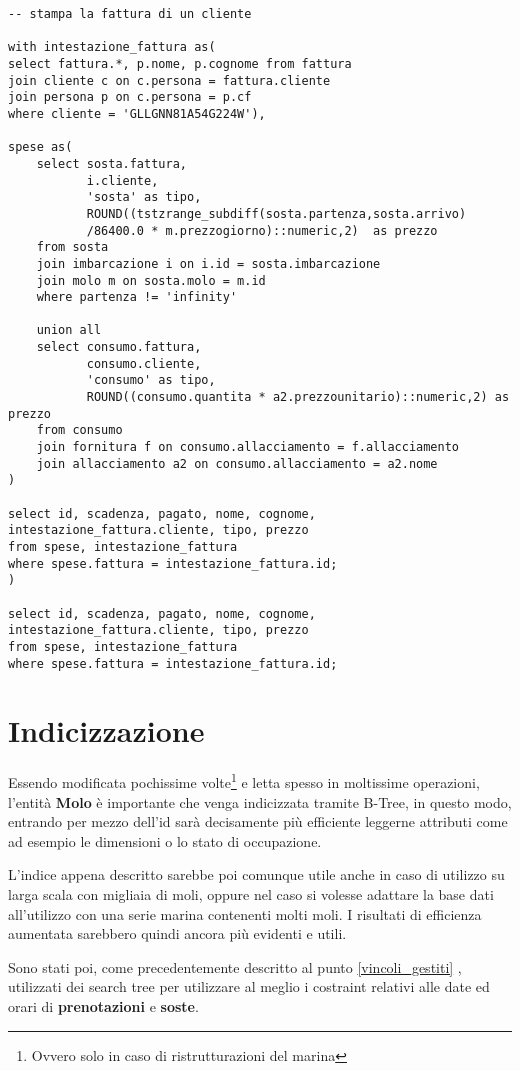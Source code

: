 \begin{lstlisting}
-- stampa la fattura di un cliente

with intestazione_fattura as(
select fattura.*, p.nome, p.cognome from fattura
join cliente c on c.persona = fattura.cliente
join persona p on c.persona = p.cf
where cliente = 'GLLGNN81A54G224W'),

spese as(
    select sosta.fattura,
           i.cliente,
           'sosta' as tipo,
           ROUND((tstzrange_subdiff(sosta.partenza,sosta.arrivo)
           /86400.0 * m.prezzogiorno)::numeric,2)  as prezzo
    from sosta
    join imbarcazione i on i.id = sosta.imbarcazione
    join molo m on sosta.molo = m.id
    where partenza != 'infinity'

    union all
    select consumo.fattura,
           consumo.cliente,
           'consumo' as tipo,
           ROUND((consumo.quantita * a2.prezzounitario)::numeric,2) as prezzo
    from consumo
    join fornitura f on consumo.allacciamento = f.allacciamento
    join allacciamento a2 on consumo.allacciamento = a2.nome
)

select id, scadenza, pagato, nome, cognome, intestazione_fattura.cliente, tipo, prezzo
from spese, intestazione_fattura
where spese.fattura = intestazione_fattura.id;
)

select id, scadenza, pagato, nome, cognome, intestazione_fattura.cliente, tipo, prezzo
from spese, intestazione_fattura
where spese.fattura = intestazione_fattura.id;
\end{lstlisting}

\section{Indicizzazione}

Essendo modificata pochissime volte\footnote{Ovvero solo in caso di ristrutturazioni del marina} e letta spesso in moltissime operazioni, l'entità \textbf{Molo} è importante che venga indicizzata tramite B-Tree, in questo modo, entrando per mezzo dell'id sarà decisamente più efficiente leggerne attributi come ad esempio le dimensioni o lo stato di occupazione.

L'indice appena descritto sarebbe poi comunque utile anche in caso di utilizzo su larga scala con migliaia di moli, oppure nel caso si volesse adattare la base dati all'utilizzo con una serie marina contenenti molti moli. I risultati di efficienza aumentata sarebbero quindi ancora più evidenti e utili.

Sono stati poi, come precedentemente descritto al punto \ref{vincoli_gestiti} , utilizzati dei search tree per utilizzare al meglio i costraint relativi alle date ed orari di \textbf{prenotazioni} e \textbf{soste}.
